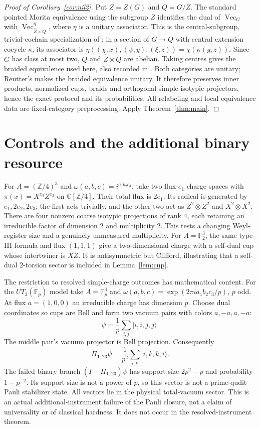 \documentclass[11pt]{amsart}
\theoremstyle{definition}\newtheorem{definition}[theorem]{Definition}
\newcommand{\C}{\mathbb C}
\newcommand{\one}{\mathbf1}
\newcommand{\VEC}{\operatorname{Vec}}
\begin{document}
\begin{proof}[Proof of Corollary~\ref{cor:nil2}]
Put $Z=Z(G)$ and $Q=G/Z$. The standard pointed Morita equivalence using
the subgroup $Z$ identifies the dual of $\VEC_G$ with
$\VEC_{\widehat Z\times Q}^{\eta}$, where $\eta$ is a unitary associator.
This is the central-subgroup, trivial-cochain specialization of
\cite[Theorems 4.5 and 4.9]{Naidu}; in a section of $G\to Q$ with central
extension cocycle $\kappa$, its associator is
$\eta((\chi,x),(\psi,y),(\xi,z))=\chi(\kappa(y,z))$.
Since $G$ has class at most two, $Q$ and $\widehat Z\times Q$ are abelian.
Taking centres gives the braided equivalence used here, also recorded in
\cite[Theorem D.1]{Fechisin}. Both categories are unitary; Reutter's
\cite[Theorem 5]{Reutter} makes the braided equivalence unitary.
It therefore preserves inner products, normalized cups, braids and orthogonal
simple-isotypic projectors, hence the exact protocol and its probabilities.
All relabeling and local equivalence data are fixed-category preprocessing.
Apply Theorem~\ref{thm:main}.
\end{proof}

\section{Controls and the additional binary resource}
For $A=(\mathbb Z/4)^3$ and $\omega(a,b,c)=i^{a_1b_2c_3}$, take two
flux-$e_1$ charge spaces with $\pi(x)=X^{x_3}Z^{x_2}$ on $\C[\mathbb Z/4]$.
Their total flux is $2e_1$. Its radical is generated by $e_1,2e_2,2e_3$;
the first acts trivially, and the other two act as $Z^2\otimes Z^2$ and
$X^2\otimes X^2$. There are four nonzero coarse isotypic projections of rank
$4$, each retaining an irreducible factor of dimension $2$ and multiplicity $2$.
This tests a changing Weyl-register size and a genuinely unmeasured multiplicity.
For $A=\mathbb F_2^3$, the same type-III formula and flux $(1,1,1)$ give
a two-dimensional charge with a self-dual cup whose intertwiner is $XZ$.
It is antisymmetric but Clifford, illustrating that a self-dual 2-torsion
sector is included in Lemma~\ref{lem:cup}.

The restriction to resolved simple-charge outcomes has mathematical content.
For the $UT_3(\mathbb F_p)$ model take $A=\mathbb F_p^3$ and
$\omega(a,b,c)=\exp(2\pi i a_1b_2c_3/p)$, $p$ odd.
At flux $a=(1,0,0)$ an irreducible charge has dimension $p$.
Choose dual coordinates so cups are Bell and form two vacuum pairs with
colors $a,-a,a,-a$:
\[
 \psi=\frac1p\sum_{i,j}|i,i,j,j\rangle.
\]
The middle pair's vacuum projector is Bell projection. Consequently
\[
 \Pi_{\one,23}\psi=\frac1{p^2}\sum_{i,k}|i,k,k,i\rangle.
\]
The failed binary branch $(I-\Pi_{\one,23})\psi$ has support size
$2p^2-p$ and probability $1-p^{-2}$. Its support size is not a power of $p$,
so this vector is not a prime-qudit Pauli stabilizer state. All vectors lie
in the physical total-vacuum sector. This is an actual additional-instrument
failure of the Pauli closure, not a claim of universality or of
classical hardness. It does not occur in the resolved-instrument theorem.
\end{document}
